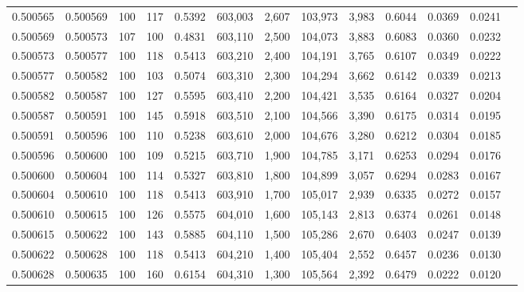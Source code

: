 \begin{tabular}{rrrrrrrrrrrrr}
0.500565 & 0.500569 &   100 & 117 &                                     0.5392 & 603,003 &   2,607 & 103,973 &   3,983 & 0.6044 & 0.0369 & 0.0241 \\
0.500569 & 0.500573 &   107 & 100 &                                     0.4831 & 603,110 &   2,500 & 104,073 &   3,883 & 0.6083 & 0.0360 & 0.0232 \\
0.500573 & 0.500577 &   100 & 118 &                                     0.5413 & 603,210 &   2,400 & 104,191 &   3,765 & 0.6107 & 0.0349 & 0.0222 \\
0.500577 & 0.500582 &   100 & 103 &                                     0.5074 & 603,310 &   2,300 & 104,294 &   3,662 & 0.6142 & 0.0339 & 0.0213 \\
0.500582 & 0.500587 &   100 & 127 &                                     0.5595 & 603,410 &   2,200 & 104,421 &   3,535 & 0.6164 & 0.0327 & 0.0204 \\
0.500587 & 0.500591 &   100 & 145 &                                     0.5918 & 603,510 &   2,100 & 104,566 &   3,390 & 0.6175 & 0.0314 & 0.0195 \\
0.500591 & 0.500596 &   100 & 110 &                                     0.5238 & 603,610 &   2,000 & 104,676 &   3,280 & 0.6212 & 0.0304 & 0.0185 \\
0.500596 & 0.500600 &   100 & 109 &                                     0.5215 & 603,710 &   1,900 & 104,785 &   3,171 & 0.6253 & 0.0294 & 0.0176 \\
0.500600 & 0.500604 &   100 & 114 &                                     0.5327 & 603,810 &   1,800 & 104,899 &   3,057 & 0.6294 & 0.0283 & 0.0167 \\
0.500604 & 0.500610 &   100 & 118 &                                     0.5413 & 603,910 &   1,700 & 105,017 &   2,939 & 0.6335 & 0.0272 & 0.0157 \\
0.500610 & 0.500615 &   100 & 126 &                                     0.5575 & 604,010 &   1,600 & 105,143 &   2,813 & 0.6374 & 0.0261 & 0.0148 \\
0.500615 & 0.500622 &   100 & 143 &                                     0.5885 & 604,110 &   1,500 & 105,286 &   2,670 & 0.6403 & 0.0247 & 0.0139 \\
0.500622 & 0.500628 &   100 & 118 &                                     0.5413 & 604,210 &   1,400 & 105,404 &   2,552 & 0.6457 & 0.0236 & 0.0130 \\
0.500628 & 0.500635 &   100 & 160 &                                     0.6154 & 604,310 &   1,300 & 105,564 &   2,392 & 0.6479 & 0.0222 & 0.0120 \\

\end{tabular}
